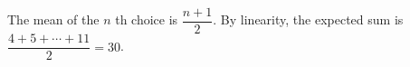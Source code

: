 The mean of the $n$ th choice is $\dfrac{n+1}{2}$. By linearity, the expected sum is $\dfrac{4+5+\cdots+11}{2}=\boxed{30}$.
